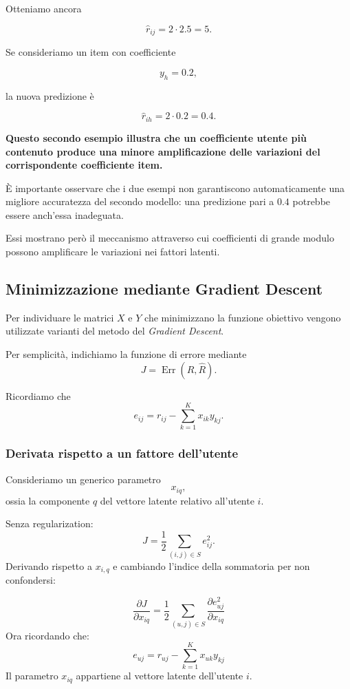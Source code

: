 Otteniamo ancora

\[
\widehat r_{ij}=2\cdot2.5=5.
\]

Se consideriamo un item con coefficiente

\[
y_h=0.2,
\]

la nuova predizione è

\[
\widehat r_{ih}=2\cdot0.2=0.4.
\]

\textbf{Questo secondo esempio illustra che un coefficiente
utente più contenuto produce una minore amplificazione
delle variazioni del corrispondente coefficiente item.}

È importante osservare che i due esempi non
garantiscono automaticamente una migliore accuratezza
del secondo modello: una predizione pari a $0.4$
potrebbe essere anch'essa inadeguata.

Essi mostrano però il meccanismo attraverso cui
coefficienti di grande modulo possono amplificare
le variazioni nei fattori latenti.


\subsection{Minimizzazione mediante Gradient Descent}

Per individuare le matrici $X$ e $Y$ che minimizzano la funzione obiettivo vengono utilizzate varianti del metodo del \emph{Gradient Descent}.

Per semplicità, indichiamo la funzione di errore mediante
\[
J
=
\operatorname{Err}(R,\widehat R).
\]

Ricordiamo che
\[
e_{ij}
=
r_{ij}
-
\sum_{k=1}^{K}x_{ik}y_{kj}.
\]

\subsubsection{Derivata rispetto a un fattore dell'utente}

Consideriamo un generico parametro
\[
x_{iq},
\]
ossia la componente $q$ del vettore latente relativo all'utente $i$.

Senza regularization:
\[
J
=
\frac{1}{2}
\sum_{(i,j)\in S}e_{ij}^{2}.
\]
Derivando rispetto a $x_{i,q}$ e cambiando l'indice della sommatoria per non confondersi:

\[
\frac{\partial J}{\partial x_{iq}}
=
\frac12\sum_{(u,j)\in S}
\frac{\partial e_{uj}^{2}}{\partial x_{iq}}
\]
Ora ricordando che:
\[
e_{uj}=r_{uj}-\sum_{k=1}^{K}x_{uk}y_{kj}
\]
Il parametro \(x_{iq}\) appartiene al vettore latente dell'utente \(i\).

